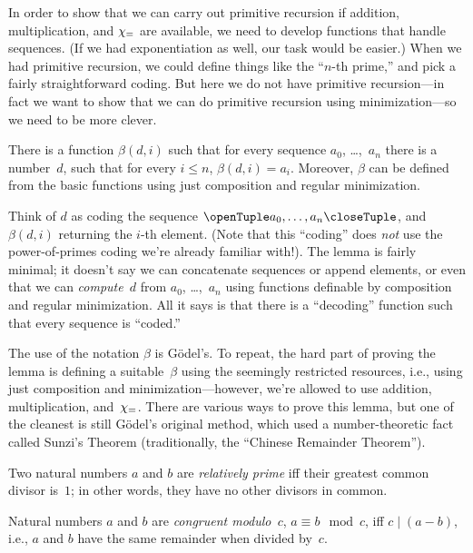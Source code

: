\documentclass[../../../include/open-logic-section]{subfiles}
\begin{document}


In order to show that we can carry out primitive recursion if
addition, multiplication, and $\chi_{=}$ are available, we need to
develop functions that handle sequences. (If we had exponentiation as
well, our task would be easier.) When we had primitive recursion, we
could define things like the ``$n$-th prime,'' and pick a fairly
straightforward coding. But here we do not have primitive
recursion---in fact we want to show that we can do primitive recursion
using minimization---so we need to be more clever.

\begin{lem}
There is a function $\beta(d,i)$ such that for every sequence $a_0$,
\dots,~$a_n$ there is a number~$d$, such that for every $i \le n$,
$\beta(d,i) = a_i$. Moreover, $\beta$ can be defined from the basic
functions using just composition and regular minimization.
\end{lem}

Think of $d$ as coding the sequence $\tuple{a_0, \dots, a_n}$, and
$\beta(d,i)$ returning the $i$-th element. (Note that this ``coding''
does \emph{not} use the power-of-primes coding we're already familiar
with!). The lemma is fairly minimal; it doesn't say we can concatenate
sequences or append elements, or even that we can \emph{compute}~$d$
from $a_0$, \dots,~$a_n$ using functions definable by composition and
regular minimization. All it says is that there is a ``decoding''
function such that every sequence is ``coded.''

The use of the notation $\beta$ is G\"odel's. To repeat, the hard part
of proving the lemma is defining a suitable~$\beta$ using the
seemingly restricted resources, i.e., using just composition and
minimization---however, we're allowed to use addition, multiplication,
and~$\chi_{=}$. There are various ways to prove this lemma, but one of
the cleanest is still G\"odel's original method, which used a
number-theoretic fact called Sunzi's Theorem
(traditionally, the ``Chinese Remainder Theorem'').

\begin{defn}
Two natural numbers $a$ and $b$ are \emph{relatively prime} iff their
greatest common divisor is~$1$; in other words, they have no other
divisors in common.
\end{defn}

\begin{defn}
Natural numbers $a$ and $b$ are \emph{congruent modulo~$c$},
$a \equiv b \mod c$, iff $c \mid (a-b)$, i.e., $a$ and $b$ have the
same remainder when divided by~$c$.
\end{defn}
\end{document}
